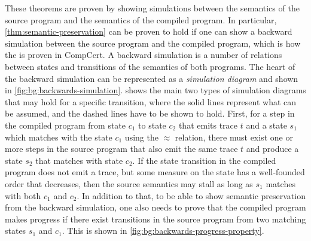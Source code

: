 These theorems are proven by showing simulations between the semantics of the
source program and the semantics of the compiled program.  In particular,
\cref{thm:semantic-preservation} can be proven to hold if one can show a
backward simulation between the source program and the compiled program, which
is how the  is proven in CompCert.  A
backward simulation is a number of relations between states and transitions of
the semantics of both programs.  The heart of the backward simulation can be
represented as a \emph{simulation diagram} and shown in
\cref{fig:bg:backwards-simulation}.  
shows the main two types of simulation diagrams that may hold for a specific
transition, where the solid lines represent what can be assumed, and the dashed
lines have to be shown to hold.  First, for a step in the compiled program from
state $c_1$ to state $c_2$ that emits trace $t$ and a state $s_1$ which matches
with the state $c_1$ using the $\approx$ relation, there must exist one or more
steps in the source program that also emit the same trace $t$ and produce a
state $s_2$ that matches with state $c_2$.  If the state transition in the
compiled program does not emit a trace, but some measure on the state has a
well-founded order that decreases, then the source semantics may stall as long
as $s_1$ matches with both $c_1$ and $c_2$.  In addition to that, to be able to
show semantic preservation from the backward simulation, one also needs to prove
that the compiled program makes progress if there exist transitions in the
source program from two matching states $s_1$ and $c_1$.  This is shown in
\cref{fig:bg:backwards-progress-property}.


